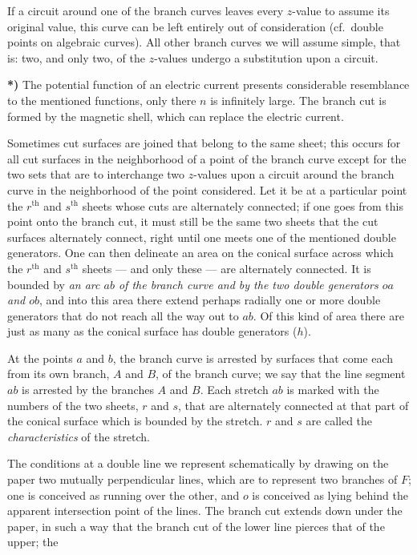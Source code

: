 \documentclass{article}
\begin{document}
If a circuit around one of the branch curves leaves every $z$-value to assume its original value, this curve can be left entirely out of consideration (cf.\ double points on algebraic curves). All other branch curves we will assume simple, that is: two, and only two, of the $z$-values undergo a substitution upon a circuit.

\textbf{*)} The potential function of an electric current presents considerable resemblance to the mentioned functions, only there $n$ is infinitely large. The branch cut is formed by the magnetic shell, which can replace the electric current.

Sometimes cut surfaces are joined that belong to the same sheet; this occurs for all cut surfaces in the neighborhood of a point of the branch curve except for the two sets that are to interchange two $z$-values upon a circuit around the branch curve in the neighborhood of the point considered. Let it be at a particular point the $r^{\text{th}}$ and $s^{\text{th}}$ sheets whose cuts are alternately connected; if one goes from this point onto the branch cut, it must still be the same two sheets that the cut surfaces alternately connect, right until one meets one of the mentioned double generators. One can then delineate an area on the conical surface across which the $r^{\text{th}}$ and $s^{\text{th}}$ sheets --- and only these --- are alternately connected. It is bounded by \emph{an arc $ab$ of the branch curve and by the two double generators $oa$ and $ob$}, and into this area there extend perhaps radially one or more double generators that do not reach all the way out to $ab$. Of this kind of area there are just as many as the conical surface has double generators ($h$).

At the points $a$ and $b$, the branch curve is arrested by surfaces that come each from its own branch, $A$ and $B$, of the branch curve; we say that the line segment $ab$ is arrested by the branches $A$ and $B$. Each stretch $ab$ is marked with the numbers of the two sheets, $r$ and $s$, that are alternately connected at that part of the conical surface which is bounded by the stretch. $r$ and $s$ are called the \emph{characteristics} of the stretch.

The conditions at a double line we represent schematically by drawing on the paper two mutually perpendicular lines, which are to represent two branches of $F$; one is conceived as running over the other, and $o$ is conceived as lying behind the apparent intersection point of the lines. The branch cut extends down under the paper, in such a way that the branch cut of the lower line pierces that of the upper; the
\end{document}

